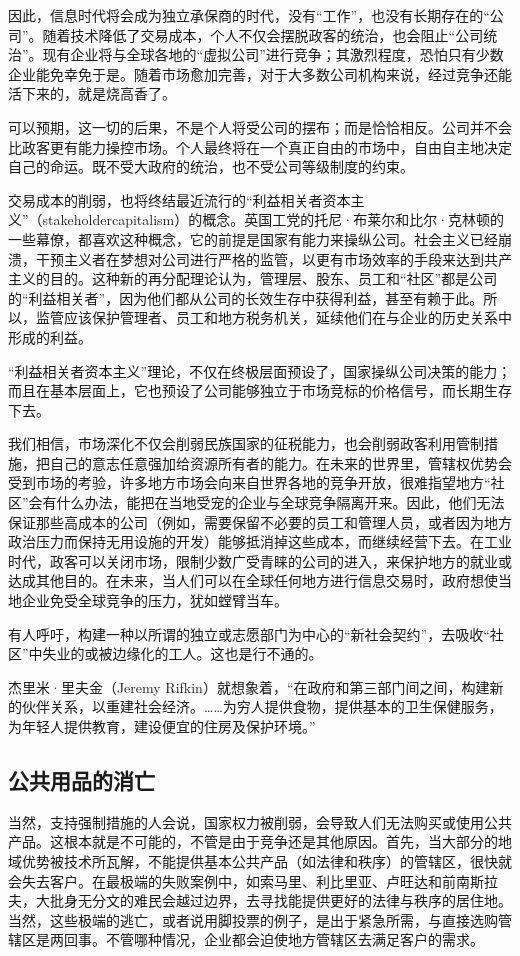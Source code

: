 因此，信息时代将会成为独立承保商的时代，没有“工作”，也没有长期存在的“公司”。随着技术降低了交易成本，个人不仅会摆脱政客的统治，也会阻止“公司统治”。现有企业将与全球各地的“虚拟公司”进行竞争；其激烈程度，恐怕只有少数企业能免幸免于是。随着市场愈加完善，对于大多数公司机构来说，经过竞争还能活下来的，就是烧高香了。

可以预期，这一切的后果，不是个人将受公司的摆布；而是恰恰相反。公司并不会比政客更有能力操控市场。个人最终将在一个真正自由的市场中，自由自主地决定自己的命运。既不受大政府的统治，也不受公司等级制度的约束。

交易成本的削弱，也将终结最近流行的“利益相关者资本主义”（stakeholdercapitalism）的概念。英国工党的托尼·布莱尔和比尔·克林顿的一些幕僚，都喜欢这种概念，它的前提是国家有能力来操纵公司。社会主义已经崩溃，干预主义者在梦想对公司进行严格的监管，以更有市场效率的手段来达到共产主义的目的。这种新的再分配理论认为，管理层、股东、员工和“社区”都是公司的“利益相关者”，因为他们都从公司的长效生存中获得利益，甚至有赖于此。所以，监管应该保护管理者、员工和地方税务机关，延续他们在与企业的历史关系中形成的利益。

“利益相关者资本主义”理论，不仅在终极层面预设了，国家操纵公司决策的能力；而且在基本层面上，它也预设了公司能够独立于市场竞标的价格信号，而长期生存下去。

我们相信，市场深化不仅会削弱民族国家的征税能力，也会削弱政客利用管制措施，把自己的意志任意强加给资源所有者的能力。在未来的世界里，管辖权优势会受到市场的考验，许多地方市场会向来自世界各地的竞争开放，很难指望地方“社区”会有什么办法，能把在当地受宠的企业与全球竞争隔离开来。因此，他们无法保证那些高成本的公司（例如，需要保留不必要的员工和管理人员，或者因为地方政治压力而保持无用设施的开发）能够抵消掉这些成本，而继续经营下去。在工业时代，政客可以关闭市场，限制少数广受青睐的公司的进入，来保护地方的就业或达成其他目的。在未来，当人们可以在全球任何地方进行信息交易时，政府想使当地企业免受全球竞争的压力，犹如螳臂当车。

有人呼吁，构建一种以所谓的独立或志愿部门为中心的“新社会契约”，去吸收“社区”中失业的或被边缘化的工人。这也是行不通的。

杰里米·里夫金（Jeremy Rifkin）就想象着，“在政府和第三部门间之间，构建新的伙伴关系，以重建社会经济。……为穷人提供食物，提供基本的卫生保健服务，为年轻人提供教育，建设便宜的住房及保护环境。”

\subsection{公共用品的消亡}
当然，支持强制措施的人会说，国家权力被削弱，会导致人们无法购买或使用公共产品。这根本就是不可能的，不管是由于竞争还是其他原因。首先，当大部分的地域优势被技术所瓦解，不能提供基本公共产品（如法律和秩序）的管辖区，很快就会失去客户。在最极端的失败案例中，如索马里、利比里亚、卢旺达和前南斯拉夫，大批身无分文的难民会越过边界，去寻找能提供更好的法律与秩序的居住地。当然，这些极端的逃亡，或者说用脚投票的例子，是出于紧急所需，与直接选购管辖区是两回事。不管哪种情况，企业都会迫使地方管辖区去满足客户的需求。

